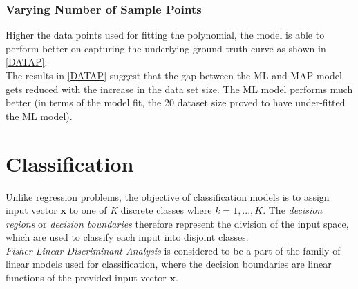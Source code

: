 \documentclass[12pt,twoside,a4paper]{article}
\begin{document}
\subsubsection{Varying Number of Sample Points}

Higher the data points used for fitting the polynomial, the model is able to perform better on capturing the underlying ground truth curve as shown in \ref{DATAP}. \\
The results in \ref{DATAP} suggest that the gap between the ML and MAP model gets reduced with the increase in the data set size. The ML model performs much better (in terms of the model fit, the 20 dataset size proved to have under-fitted the ML model).

\section{Classification}
Unlike regression problems, the objective of classification models is to assign input vector $\textbf{x}$ to one of \textit{K} discrete classes where $k = 1,...,K$. The \textit{decision regions} or \textit{decision boundaries} therefore represent the division of the input space, which are used to classify each input into disjoint classes.\\
\textit{Fisher Linear Discriminant Analysis} is considered to be a part of the family of linear models used for classification, where the decision boundaries are linear functions of the provided input vector $\textbf{x}$.
\end{document}
